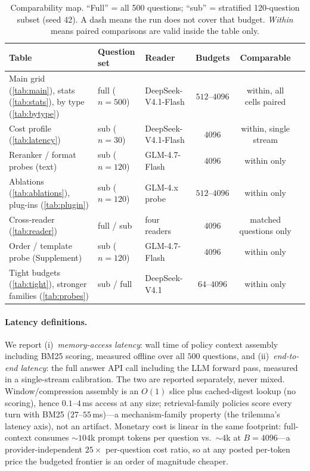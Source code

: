 \documentclass{article} %
\begin{document}
\begin{table}[h]
\centering\scriptsize
\caption{Comparability map. ``Full'' = all 500 questions; ``sub'' = stratified 120-question
subset (seed 42). A dash means the run does not cover that budget. \emph{Within} means
paired comparisons are valid inside the table only.}
\label{tab:map}
\setlength{\tabcolsep}{2pt}
\begin{tabular}{lllccl}
\toprule
Table & Question set & Reader & Budgets & Comparable \\
\midrule
Main grid (\ref{tab:main}), stats (\ref{tab:stats}), by type (\ref{tab:bytype})
  & full ($n{=}500$) & DeepSeek-V4.1-Flash & $512$--$4096$ & within, all cells paired \\
Cost profile (\ref{tab:latency}) & sub ($n{=}30$) & DeepSeek-V4.1-Flash & $4096$ & within, single stream \\
Reranker / format probes (text) & sub ($n{=}120$) & GLM-4.7-Flash & $4096$ & within only \\
Ablations (\ref{tab:ablations}), plug-ins (\ref{tab:plugin}) & sub ($n{=}120$) & GLM-4.x probe & $512$--$4096$ & within only \\
Cross-reader (\ref{tab:reader}) & full / sub & four readers & $4096$ & matched questions only \\
Order / template probe (Supplement) & sub ($n{=}120$) & GLM-4.7-Flash & $4096$ & within only \\
Tight budgets (\ref{tab:tight}), stronger families (\ref{tab:probes}) & sub / full & DeepSeek-V4.1 & $64$--$4096$ & within only \\
\bottomrule
\end{tabular}
\end{table}

\paragraph{Latency definitions.} We report (i)~\emph{memory-access latency}: wall time of
policy context assembly including BM25 scoring, measured offline over all $500$ questions, and
(ii)~\emph{end-to-end latency}: the full answer API call including the LLM forward pass,
measured in a single-stream calibration. The two are reported separately, never mixed.
Window/compression assembly is an $O(1)$ slice plus cached-digest lookup (no scoring), hence
$0.1$--$4$\,ms access at any size; retrieval-family policies score every turn with BM25
($27$--$55$\,ms)---a mechanism-family property (the trilemma's latency axis), not an artifact.
Monetary cost is linear in the same footprint: full-context consumes ${\sim}104$k prompt
tokens per question vs.\ ${\sim}4$k at $B{=}4096$---a provider-independent $25\times$
per-question cost ratio, so at any posted per-token price the budgeted frontier is an order
of magnitude cheaper.
\end{document}
